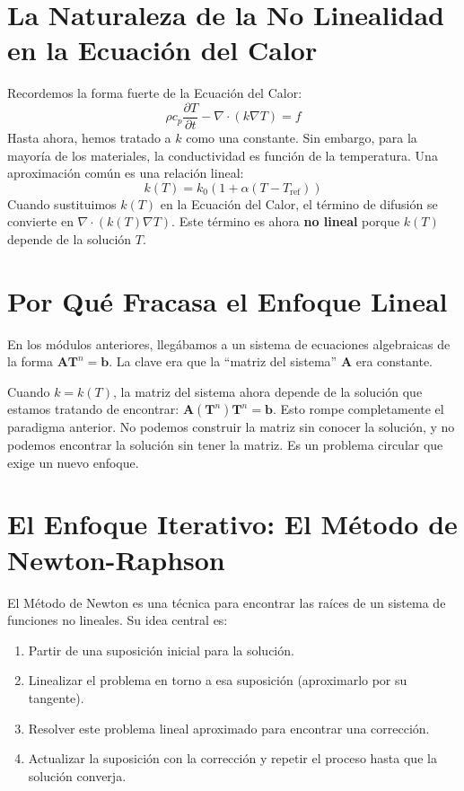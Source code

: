 \section{La Naturaleza de la No Linealidad en la Ecuación del Calor}
Recordemos la forma fuerte de la Ecuación del Calor:
$$ \rho c_p \frac{\partial T}{\partial t} - \nabla \cdot (k \nabla T) = f $$
Hasta ahora, hemos tratado a $k$ como una constante. Sin embargo, para la mayoría de los materiales, la conductividad es función de la temperatura. Una aproximación común es una relación lineal:
\begin{equation}
    k(T) = k_0 (1 + \alpha (T - T_{\text{ref}}))
    \label{eq:k_lineal}
\end{equation}
Cuando sustituimos $k(T)$ en la Ecuación del Calor, el término de difusión se convierte en $\nabla \cdot (k(T) \nabla T)$. Este término es ahora \textbf{no lineal} porque $k(T)$ depende de la solución $T$.

\section{Por Qué Fracasa el Enfoque Lineal}
En los módulos anteriores, llegábamos a un sistema de ecuaciones algebraicas de la forma $\mathbf{A} \mathbf{T}^n = \mathbf{b}$. La clave era que la ``matriz del sistema'' $\mathbf{A}$ era constante.

Cuando $k = k(T)$, la matriz del sistema ahora depende de la solución que estamos tratando de encontrar: $\mathbf{A}(\mathbf{T}^n) \mathbf{T}^n = \mathbf{b}$. Esto rompe completamente el paradigma anterior. No podemos construir la matriz sin conocer la solución, y no podemos encontrar la solución sin tener la matriz. Es un problema circular que exige un nuevo enfoque.

\section{El Enfoque Iterativo: El Método de Newton-Raphson}
El Método de Newton es una técnica para encontrar las raíces de un sistema de funciones no lineales. Su idea central es:
\begin{enumerate}
    \item Partir de una suposición inicial para la solución.
    \item Linealizar el problema en torno a esa suposición (aproximarlo por su tangente).
    \item Resolver este problema lineal aproximado para encontrar una corrección.
    \item Actualizar la suposición con la corrección y repetir el proceso hasta que la solución converja.
\end{enumerate}

